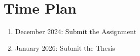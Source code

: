 \documentclass{article}
\begin{document}
	\section{Time Plan}
	\begin{enumerate}
		\item December 2024: Submit the Assignment
		\item January 2026: Submit the Thesis
	\end{enumerate}
\end{document}
